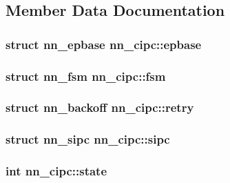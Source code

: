 \subsection{Member Data Documentation}
\subsubsection[{epbase}]{\setlength{\rightskip}{0pt plus 5cm}struct {\bf nn\+\_\+epbase} nn\+\_\+cipc\+::epbase}\hypertarget{structnn__cipc_a767b765afab0b1be9653b01d30dbb36c}{}\label{structnn__cipc_a767b765afab0b1be9653b01d30dbb36c}
\subsubsection[{fsm}]{\setlength{\rightskip}{0pt plus 5cm}struct {\bf nn\+\_\+fsm} nn\+\_\+cipc\+::fsm}\hypertarget{structnn__cipc_ac3cb2e6f10f0e78f849c6aaa4ba6592a}{}\label{structnn__cipc_ac3cb2e6f10f0e78f849c6aaa4ba6592a}
\subsubsection[{retry}]{\setlength{\rightskip}{0pt plus 5cm}struct {\bf nn\+\_\+backoff} nn\+\_\+cipc\+::retry}\hypertarget{structnn__cipc_a7e238ae735a8050ae193bfa46195ed5e}{}\label{structnn__cipc_a7e238ae735a8050ae193bfa46195ed5e}
\subsubsection[{sipc}]{\setlength{\rightskip}{0pt plus 5cm}struct {\bf nn\+\_\+sipc} nn\+\_\+cipc\+::sipc}\hypertarget{structnn__cipc_a41de9ef8bc50161ae4ffd19e9ead3f06}{}\label{structnn__cipc_a41de9ef8bc50161ae4ffd19e9ead3f06}
\subsubsection[{state}]{\setlength{\rightskip}{0pt plus 5cm}int nn\+\_\+cipc\+::state}\hypertarget{structnn__cipc_af9b878e110d6071b4e693f3dd6e89213}{}\label{structnn__cipc_af9b878e110d6071b4e693f3dd6e89213}
